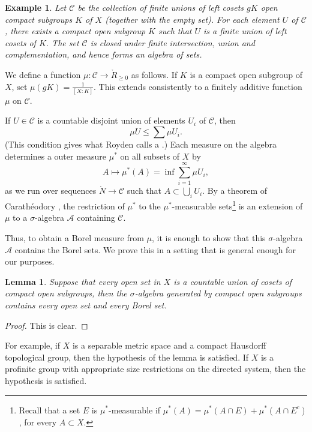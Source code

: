 \documentclass{amsart}
\newtheorem{lemma}[equation]{Lemma}
\newtheorem{example}[exercise]{Example}
\def\cC{{\mathcal C}}
\begin{document}
\begin{example} Let $\cC$ be the collection of finite unions of
  left cosets $gK$ open compact subgroups $K$ of $X$ (together with
  the empty set).  For each element $U$ of $\cC$, there exists a
  compact open subgroup $K$ such that $U$ is a finite union of left
  cosets of $K$.  The set $\cC$ is closed under finite
  intersection, union and complementation, and hence forms an algebra
  of sets.
\end{example}

We define a function $\mu:\cC \to \ring{R}_{\ge0}$ as follows.
If $K$ is a compact open subgroup of $X$,
set $\mu(g K) = \frac{1}{[X:K]}$.  This extends consistently to a
finitely additive function $\mu$ on $\cC$.

If $U\in \cC$ is a countable disjoint union of elements $U_i$ of
$\cC$, then
\[
\mu U \le \sum \mu U_i.
\]
(This condition gives what Royden \cite[p 260]{royden} 
calls a .)  Each measure on the algebra determines
a outer measure $\mu^*$ on all subsets of $X$ by
\[
A \mapsto \mu^*(A) = \inf \sum_{i=1}^\infty \mu U_i,
\]
as we run over sequences $\ring{N}\to \cC$ such that $A\subset
\bigcup_i U_i$.  By a theorem of Carath\'eodory \cite[p 257]{royden},
the restriction of $\mu^*$ to the $\mu^*$-measurable
sets\footnote{Recall that a set $E$ is $\mu^*$-measurable if $\mu^*(A)
  = \mu^*(A\cap E) + \mu^*(A\cap E^c)$, for every $A\subset X$.} is an
extension of $\mu$ to a $\sigma$-algebra ${\mathcal A}$ containing $\cC$.

Thus, to obtain a Borel measure from $\mu$,
it is enough to show that this $\sigma$-algebra ${\mathcal A}$ contains the
Borel sets.  We prove this in a setting that is general enough for our purposes.

\begin{lemma} Suppose that every open set in $X$ is a countable union of
cosets of compact open subgroups, then the $\sigma$-algebra generated by
compact open subgroups contains every open set and every Borel set.
\end{lemma}

\begin{proof} This is clear.
\end{proof}

For example, if $X$ is a separable metric space and a compact Hausdorff topological
group, then the hypothesis of the lemma is satisfied.  If $X$ is a profinite group with
appropriate size restrictions on the directed system, then the hypothesis is satisfied.
\end{document}
